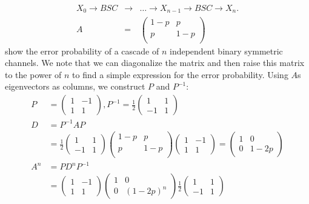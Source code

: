 \documentclass[10pt]{article}
\begin{document}
\begin{tiny}
\begin{multicols}{3}
\begin{eqnarray*}
    X_0 \rightarrow BSC &\rightarrow& \dots
    \rightarrow X_{n-1} \rightarrow BSC \rightarrow X_n. \\
 A &=&
 \begin{pmatrix}
  1-p & p   \\
  p   & 1-p \\
 \end{pmatrix}
\end{eqnarray*}
show the error probability of a cascade of $n$ independent binary symmetric channels. We note that we can diagonalize the matrix and then raise this matrix to the power of $n$ to find a simple expression for the error probability. Using $A$s eigenvectors as columns, we construct $P$ and $P^{-1}$:
\begin{align*}
P &= \begin{pmatrix} 1 & -1 \\ 1 & 1 \end{pmatrix}, P^{-1} = \frac{1}{2}\begin{pmatrix} 1 & 1 \\ -1 & 1 \end{pmatrix} \\
D &= P^{-1}AP \\
    &= \frac{1}{2}\begin{pmatrix} 1 & 1 \\ -1 & 1 \end{pmatrix}  \begin{pmatrix}
        1-p & p   \\
        p   & 1-p \\
    \end{pmatrix}\begin{pmatrix} 1 & -1 \\ 1 & 1 \end{pmatrix}
    = \begin{pmatrix} 1 & 0 \\ 0 & 1 - 2p \end{pmatrix}  \\
A^n &= PD^nP^{-1} \\
    &= \begin{pmatrix} 1 & -1 \\ 1 & 1 \end{pmatrix} \begin{pmatrix} 1 & 0 \\ 0 & (1 - 2p)^n \end{pmatrix} \frac{1}{2}\begin{pmatrix} 1 & 1 \\ -1 & 1 \end{pmatrix} \\

\end{align*}
\end{multicols}
\end{tiny}
\end{document}
